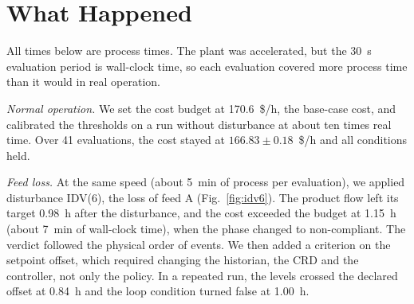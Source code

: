 \documentclass[conference]{IEEEtran}
\begin{document}
\section{What Happened}

All times below are process times. The plant was accelerated, but the 30~s evaluation period is wall-clock time, so each evaluation covered more process time than it would in real operation.

\textit{Normal operation.} We set the cost budget at 170.6~\$/h, the base-case cost, and calibrated the thresholds on a run without disturbance at about ten times real time. Over 41 evaluations, the cost stayed at $166.83 \pm 0.18$~\$/h and all conditions held.

\textit{Feed loss.} At the same speed (about 5~min of process per evaluation), we applied disturbance IDV(6), the loss of feed A (Fig.~\ref{fig:idv6}). The product flow left its target 0.98~h after the disturbance, and the cost exceeded the budget at 1.15~h (about 7~min of wall-clock time), when the phase changed to non-compliant. The verdict followed the physical order of events. We then added a criterion on the setpoint offset, which required changing the historian, the CRD and the controller, not only the policy. In a repeated run, the levels crossed the declared offset at 0.84~h and the loop condition turned false at 1.00~h.
\end{document}
